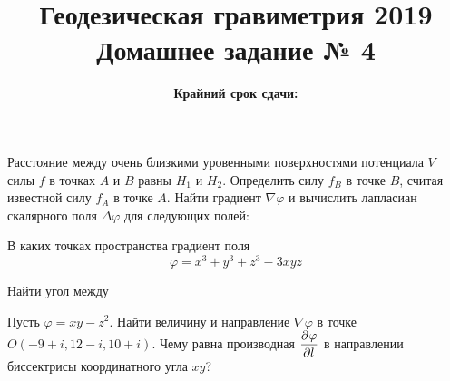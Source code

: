 \documentclass[11pt, a4paper,addpoints]{exam}
\title{{\Large Геодезическая гравиметрия 2019}\\ 
    {\bf\Large Домашнее задание № 4}}
\author{}
\date{\normalsize\bf Крайний срок сдачи: \DTMusedate{deadline}}
\theoremstyle{remark}
\renewcommand{\phi}{\ensuremath{\varphi}}
\begin{document}
\maketitle
\thispagestyle{empty}
\begin{questions}
		\question[1] Расстояние между очень близкими уровенными поверхностями потенциала $V$ силы $f$ в точках $A$ и $B$ равны $H_1$ и $H_2$. Определить силу $f_B$ в точке $B$, считая известной силу $f_A$ в точке $A$.
        \question[1] Найти градиент $\nabla \phi$ и вычислить лапласиан скалярного поля $\Delta \phi$ для следующих полей:
        \question[1] В каких точках пространства градиент поля
        \begin{equation*}
        	\phi = x^3 + y^3 + z^3 - 3xyz
        \end{equation*}
        \question[1] Найти угол между
        \question[1] Пусть $ \phi = xy - z^2$. Найти величину и направление $\nabla \phi$  в точке $O(-9+i, 12-i, 10+i)$. Чему равна производная $\dpd{\phi}{l}$ в направлении биссектрисы координатного угла $xy$?
\end{questions}
\end{document}
